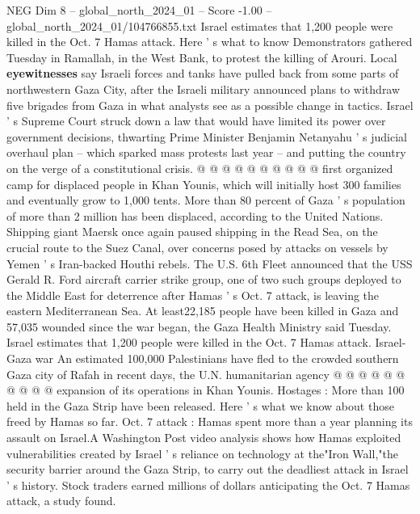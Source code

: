 \begin{textsample}{NEG Dim 8 – global\_north\_2024\_01 – Score -1.00 – global\_north\_2024\_01/104766855.txt}
Israel estimates that 1,200 people were killed in the Oct. 7 Hamas attack.
Here ' s what to know Demonstrators gathered Tuesday in Ramallah, in the West Bank, to protest the killing of Arouri.
Local \textbf{eyewitnesses} say Israeli forces and tanks have pulled back from some parts of northwestern Gaza City, after the Israeli military announced plans to withdraw five brigades from Gaza in what analysts see as a possible change in tactics.
Israel ' s Supreme Court struck down a law that would have limited its power over government decisions, thwarting Prime Minister Benjamin Netanyahu ' s judicial overhaul plan -- which sparked mass protests last year -- and putting the country on the verge of a constitutional crisis. @ @ @ @ @ @ @ @ @ @ first organized camp for displaced people in Khan Younis, which will initially host 300 families and eventually grow to 1,000 tents.
More than 80 percent of Gaza ' s population of more than 2 million has been displaced, according to the United Nations.
Shipping giant Maersk once again paused shipping in the Read Sea, on the crucial route to the Suez Canal, over concerns posed by attacks on vessels by Yemen ' s Iran-backed Houthi rebels.
The U.S. 6th Fleet announced that the USS Gerald R.
Ford aircraft carrier strike group, one of two such groups deployed to the Middle East for deterrence after Hamas ' s Oct. 7 attack, is leaving the eastern Mediterranean Sea.
At least22,185 people have been killed in Gaza and 57,035 wounded since the war began, the Gaza Health Ministry said Tuesday.
Israel estimates that 1,200 people were killed in the Oct. 7 Hamas attack.
Israel-Gaza war An estimated 100,000 Palestinians have fled to the crowded southern Gaza city of Rafah in recent days, the U.N. humanitarian agency @ @ @ @ @ @ @ @ @ @ expansion of its operations in Khan Younis.
Hostages : More than 100 held in the Gaza Strip have been released.
Here ' s what we know about those freed by Hamas so far.
Oct. 7 attack : Hamas spent more than a year planning its assault on Israel.A Washington Post video analysis shows how Hamas exploited vulnerabilities created by Israel ' s reliance on technology at the"Iron Wall,"the security barrier around the Gaza Strip, to carry out the deadliest attack in Israel ' s history.
Stock traders earned millions of dollars anticipating the Oct. 7 Hamas attack, a study found.

\end{textsample}

